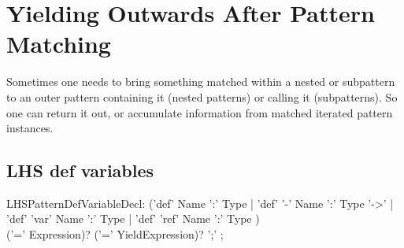 
\section{Yielding Outwards After Pattern Matching} 

Sometimes one needs to bring something matched within a nested or subpattern to an outer pattern containing it (nested patterns) or calling it (subpatterns).
So one can return it out, or accumulate information from matched iterated pattern instances. 

\subsection{LHS def variables} 

\begin{rail} 
  LHSPatternDefVariableDecl: 
	('def' Name ':' Type |
	'def' '-' Name ':' Type '->' |
	'def' 'var' Name ':' Type |
	'def' 'ref' Name ':' Type ) \\
	('=' Expression)? ('=' YieldExpression)? ';'
	;
\end{rail}

